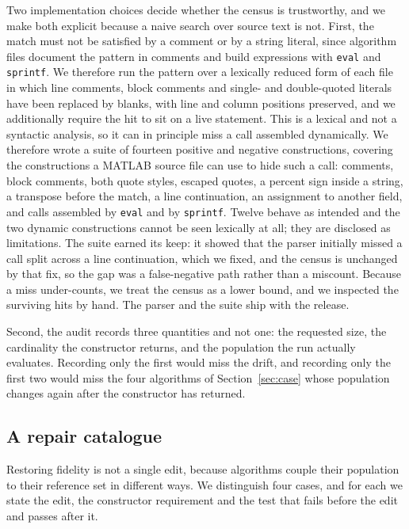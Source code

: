 \documentclass{SCIS2026}
\begin{document}
Two implementation choices decide whether the census is trustworthy, and we make both explicit because a naive search over source text is not. First, the match must not be satisfied by a comment or by a string literal, since algorithm files document the pattern in comments and build expressions with \texttt{eval} and \texttt{sprintf}. We therefore run the pattern over a lexically reduced form of each file in which line comments, block comments and single- and double-quoted literals have been replaced by blanks, with line and column positions preserved, and we additionally require the hit to sit on a live statement. This is a lexical and not a syntactic analysis, so it can in principle miss a call assembled dynamically. We therefore wrote a suite of fourteen positive and negative constructions, covering the constructions a MATLAB source file can use to hide such a call: comments, block comments, both quote styles, escaped quotes, a percent sign inside a string, a transpose before the match, a line continuation, an assignment to another field, and calls assembled by \texttt{eval} and by \texttt{sprintf}. Twelve behave as intended and the two dynamic constructions cannot be seen lexically at all; they are disclosed as limitations. The suite earned its keep: it showed that the parser initially missed a call split across a line continuation, which we fixed, and the census is unchanged by that fix, so the gap was a false-negative path rather than a miscount. Because a miss under-counts, we treat the census as a lower bound, and we inspected the \nLexFiles{} surviving hits by hand. The parser and the suite ship with the release.

Second, the audit records three quantities and not one: the requested size, the cardinality the constructor returns, and the population the run actually evaluates. Recording only the first would miss the drift, and recording only the first two would miss the four algorithms of Section~\ref{sec:case} whose population changes again after the constructor has returned.

\subsection{A repair catalogue}
\label{sec:catalogue}
Restoring fidelity is not a single edit, because algorithms couple their population to their reference set in different ways. We distinguish four cases, and for each we state the edit, the constructor requirement and the test that fails before the edit and passes after it.
\end{document}
